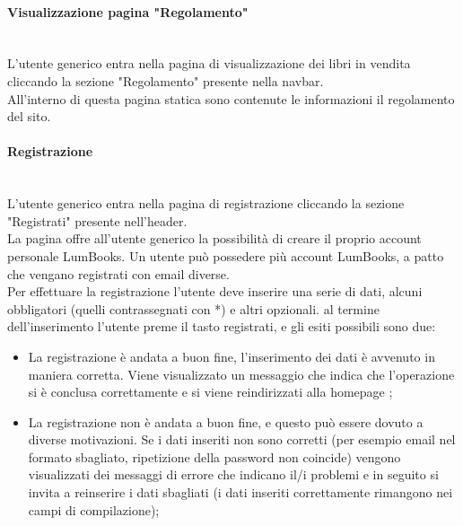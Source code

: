 \paragraph{Visualizzazione pagina "Regolamento"}\mbox{}\\
\label{par:VisReg}
L'utente generico entra nella pagina di visualizzazione dei libri in vendita cliccando la sezione "Regolamento" presente nella navbar.\\
All'interno di questa pagina statica sono contenute le informazioni il regolamento del sito.

\paragraph{Registrazione}\mbox{}\\
\label{par:Reg}
L'utente generico entra nella pagina di registrazione cliccando la sezione "Registrati" presente nell'header.\\
La pagina offre all'utente generico la possibilità di creare il proprio account personale LumBooks. Un utente può possedere più account LumBooks, a patto che vengano registrati con email diverse.\\
Per effettuare la registrazione l'utente deve inserire una serie di dati, alcuni obbligatori (quelli contrassegnati con *) e altri opzionali. al termine dell'inserimento l'utente preme il tasto registrati, e gli esiti possibili sono due:
\begin{itemize}
	\item La registrazione è andata a buon fine, l'inserimento dei dati è avvenuto in maniera corretta. Viene visualizzato un messaggio che indica che l'operazione si è conclusa correttamente e si viene reindirizzati alla homepage ;
	\item La registrazione non è andata a buon fine, e questo può essere dovuto a diverse motivazioni. Se i dati inseriti non sono corretti (per esempio email nel formato sbagliato, ripetizione della password non coincide) vengono visualizzati dei messaggi di errore che indicano il/i problemi e in seguito si invita a reinserire i dati sbagliati (i dati inseriti correttamente rimangono nei campi di compilazione);
\end{itemize}

